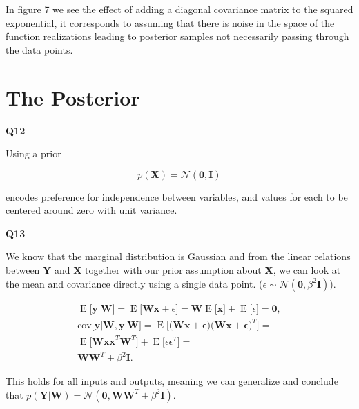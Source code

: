 \documentclass[a4paper]{article}
\DeclareMathOperator{\E}{E}
\begin{document}
\noindent In figure 7 we see the effect of adding a diagonal covariance matrix to the squared exponential, it corresponds to assuming that there is noise in the space of the function realizations leading to posterior samples not necessarily passing through the data points.

\section{The Posterior}

\noindent\textbf{Q12}

\noindent\makebox[\linewidth]{\rule{\textwidth}{0.4pt}}
\hfil

\noindent Using a prior

\begin{equation*}
p(\mathbf{X})=\mathcal{N}(\mathbf{0,I})
\end{equation*} 

\noindent encodes preference for independence between variables, and values for each to be centered around zero with unit variance.
 
\hfil

\noindent\textbf{Q13}

\noindent\makebox[\linewidth]{\rule{\textwidth}{0.4pt}}
\hfil

\noindent We know that the marginal distribution is Gaussian and from the linear relations between $\mathbf{Y}$ and $\mathbf{X}$ together with our prior assumption about $\mathbf{X}$, we can look at the mean and covariance directly using a single data point. ($\epsilon\sim\mathcal{N}(\mathbf{0},\beta^2\mathbf{I})$).

\begin{align*}
\E\big[\mathbf{\mathbf{y}\vert W}\big] =\E\big[\mathbf{Wx}+\epsilon\big]=\mathbf{W}\E\big[\mathbf{x}\big] + \E\big[\epsilon\big] = \mathbf{0},\\
\text{cov}\big[\mathbf{y\vert W,y\vert W}\big]= \E\big[\big(\mathbf{Wx+\epsilon}\big)\big(\mathbf{Wx+\epsilon}\big)^T\big]=\\\E\big[\mathbf{Wxx}^T\mathbf{W}^T\big]+\E\big[\epsilon\epsilon^T\big]=\\ \mathbf{WW}^T+\beta^2\mathbf{I}.
\end{align*}

\noindent This holds for all inputs and outputs, meaning we can generalize and conclude that $p(\mathbf{Y\vert W})=\mathcal{N}(\mathbf{0},\mathbf{WW}^T+\beta^2\mathbf{I})$.

\hfil
\end{document}
